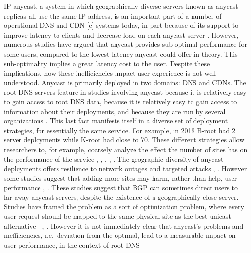 \documentclass[sigconf,nonacm,10pt]{acmart}
\begin{document}
\label{sec:introduction} IP anycast, a system in which geographically
diverse servers known as anycast replicas all use the same IP address,
is an important part of a number of operational DNS
\cite{root_servers, cloudflare_anycast, akamai_anycast, route53_anycast, google_public_dns}
and CDN
{[}c{]}\cite{calder2015analyzing,edgecast_anycast,amazon_cloudfront}
systems today, in part because of its support to improve latency to
clients and decrease load on each anycast server
\cite{katabi2000framework,metz2002ip,rfc_1546}. However, numerous
studies have argued that anycast provides sub-optimal performance for
some users, compared to the lowest latency anycast could offer in
theory. This sub-optimality implies a great latency cost to the user.
Despite these implications, how these inefficiencies impact user
experience is not well understood. \break[d] \break
Anycast is primarily deployed in two domains: DNS and CDNs. The root DNS
servers feature in studies involving anycast because it is relatively
easy to gain access to root DNS data, because it is relatively easy to
gain access to information about their deployments, and because they are
run by several organizations \cite{root_servers}. This last fact
manifests itself in a diverse set of deployment strategies, for
essentially the same service. For example, in 2018 B-root had 2 server
deployments while K-root had close to 70. These different strategies
allow researchers to, for example, coarsely analyze the effect the
number of sites has on the performance of the service
\cite{colitti2006evaluating}, \cite{moura2016anycast},
\cite{de2017anycast}, \cite{li_levin_spring_bhattacharjee_2018},
\cite{mcquistin2019taming}. \break \break
The geographic diversity of anycast deployments offers resilience to
network outages and targeted attacks
\cite{li_levin_spring_bhattacharjee_2018}, \cite{moura2016anycast}.
However some studies suggest that adding more sites may harm, rather
than help, user performance \cite{li_levin_spring_bhattacharjee_2018},
\cite{sarat2006use}. These studies suggest that BGP can sometimes direct
users to far-away anycast servers, despite the existence of a
geographically close server. Studies have framed the problem as a sort
of optimization problem, where every user request should be mapped to
the same physical site as the best unicast alternative
\cite{mcquistin2019taming}, \cite{li_levin_spring_bhattacharjee_2018},
\cite{de2017anycast}. However it is not immediately clear that anycast's
problems and inefficiencies, i.e.~deviation from the optimal, lead to a
measurable impact on user performance, in the context of root DNS
\end{document}
